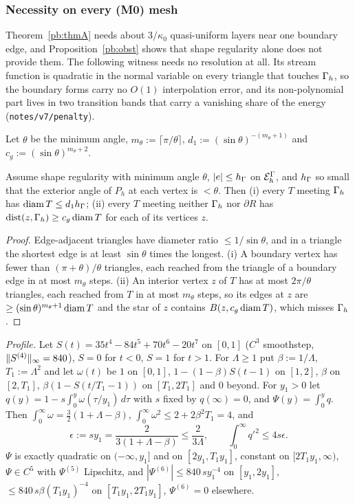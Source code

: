 \subsubsection{Necessity on every (M0) mesh}\label{pb:sec:M0}

Theorem~\ref{pb:thmA} needs about $3/\kappa_0$ quasi-uniform layers near one boundary edge, and Proposition~\ref{pb:obst} shows that shape regularity alone does not provide them. The following witness needs no resolution at all. Its stream function is quadratic in the normal variable on every triangle that touches $\Gamma_h$, so the boundary forms carry no $O(1)$ interpolation error, and its non-polynomial part lives in two transition bands that carry a vanishing share of the energy (\texttt{notes/v7/penalty}).

Let $\theta$ be the minimum angle, $m_\theta:=\lceil\pi/\theta\rceil$, $d_1:=(\sin\theta)^{-(m_\theta+1)}$ and $c_g:=(\sin\theta)^{m_\theta+2}$.

\begin{lemma}\label{pb:lem:growth}
Assume shape regularity with minimum angle $\theta$, $|e|\le h_\Gamma$ on $\mathcal E_h^\Gamma$, and $h_\Gamma$ so small that the exterior angle of $P_h$ at each vertex is $<\theta$. Then (i) every $T$ meeting $\Gamma_h$ has $\operatorname{diam} T\le d_1h_\Gamma$; (ii) every $T$ meeting neither $\Gamma_h$ nor $\partial R$ has $\operatorname{dist}(z,\Gamma_h)\ge c_g\operatorname{diam} T$ for each of its vertices $z$.
\end{lemma}

\begin{proof}
Edge-adjacent triangles have diameter ratio $\le1/\sin\theta$, and in a triangle the shortest edge is at least $\sin\theta$ times the longest. (i) A boundary vertex has fewer than $(\pi+\theta)/\theta$ triangles, each reached from the triangle of a boundary edge in at most $m_\theta$ steps. (ii) An interior vertex $z$ of $T$ has at most $2\pi/\theta$ triangles, each reached from $T$ in at most $m_\theta$ steps, so its edges at $z$ are $\ge(\sin\theta)^{m_\theta+1}\operatorname{diam} T$ and the star of $z$ contains $B(z,c_g\operatorname{diam} T)$, which misses $\Gamma_h$.
\end{proof}

\emph{Profile.} Let $S(t)=35t^4-84t^5+70t^6-20t^7$ on $[0,1]$ ($C^3$ smoothstep, $\lVert S^{(4)}\rVert_\infty=840$), $S=0$ for $t<0$, $S=1$ for $t>1$. For $\Lambda\ge1$ put $\beta:=1/\Lambda$, $T_1:=\Lambda^2$ and let $\omega(t)$ be $1$ on $[0,1]$, $1-(1-\beta)S(t-1)$ on $[1,2]$, $\beta$ on $[2,T_1]$, $\beta(1-S(t/T_1-1))$ on $[T_1,2T_1]$ and $0$ beyond. For $y_1>0$ let $q(y)=1-s\int_0^y\omega(\tau/y_1)\,d\tau$ with $s$ fixed by $q(\infty)=0$, and $\Psi(y)=\int_0^yq$. Then $\int_0^\infty\omega=\frac32(1+\Lambda-\beta)$, $\int_0^\infty\omega^2\le2+2\beta^2T_1=4$, and
\[
\epsilon:=sy_1=\frac2{3(1+\Lambda-\beta)}\le\frac2{3\Lambda},\qquad \int_0^\infty q'^2\le4s\epsilon .
\]
$\Psi$ is exactly quadratic on $(-\infty,y_1]$ and on $[2y_1,T_1y_1]$, constant on $[2T_1y_1,\infty)$, $\Psi\in C^5$ with $\Psi^{(5)}$ Lipschitz, and $|\Psi^{(6)}|\le840\,sy_1^{-4}$ on $[y_1,2y_1]$, $\le840\,s\beta(T_1y_1)^{-4}$ on $[T_1y_1,2T_1y_1]$, $\Psi^{(6)}=0$ elsewhere.

